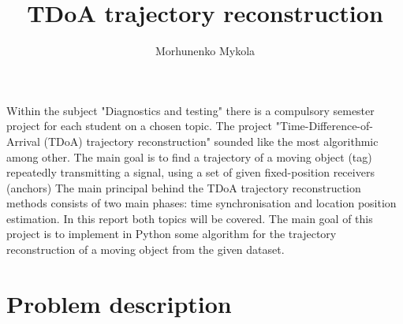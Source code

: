 \documentclass[10pt,journal,compsoc]{IEEEtran}
\begin{document}
\title{TDoA trajectory reconstruction}
\author{Morhunenko Mykola}
\maketitle

Within the subject "Diagnostics and testing" there is a compulsory semester project for each student on a chosen topic.
The project "Time-Difference-of-Arrival (TDoA) trajectory reconstruction" sounded like the most algorithmic among other. 
The main goal is to find a trajectory of a moving object (tag) repeatedly transmitting a signal, using a set of given fixed-position receivers (anchors)
The main principal behind the TDoA trajectory reconstruction methods consists of two main phases: time synchronisation and location position estimation.
In this report both topics will be covered.
The main goal of this project is to implement in Python some algorithm for the trajectory reconstruction of a moving object from the given dataset.

\section{Problem description}
\label{sec:problem}

\end{document}
